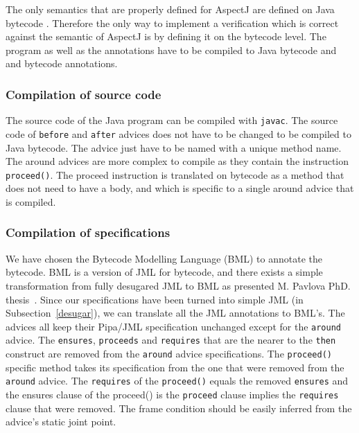 The only semantics that are properly defined for AspectJ are defined
on Java bytecode \cite{weaving06,weaving04}. Therefore the only way to
implement a verification which is correct against the semantic of
AspectJ is by defining it on the bytecode level.  The program as well
as the annotations have to be compiled to Java bytecode and
and bytecode annotations. 

\subsubsection{Compilation of source code}
The source code of the Java program can be compiled with {\tt javac}.
The source code of {\tt before} and {\tt after}
advices does not have to be changed to be compiled to Java bytecode.
The advice just have to be named with a unique method name.
The around advices are more complex to compile as they contain the instruction
{\tt proceed()}. The proceed instruction is translated on bytecode as
a method that does not need to have a body, and which is specific 
to a single around advice that is compiled.


\subsubsection{Compilation of specifications} 
We have chosen the Bytecode Modelling Language (BML) to annotate the
bytecode. BML is a version of JML for bytecode, and there exists a
simple transformation from fully desugared JML to BML as presented
M. Pavlova PhD. thesis~\cite{PavlovaPhd}. Since our specifications
have been turned into simple JML (in Subsection~\ref{desugar}), we can
translate all the JML annotations to BML's. The advices all keep their
Pipa/JML specification unchanged except for the {\tt around} advice.
The {\tt ensures}, {\tt proceeds} and {\tt requires} that are the
nearer to the {\tt then} construct are removed from the {\tt around}
advice specifications. The {\tt proceed()} specific method takes its
specification from the one that were removed from the {\tt around} advice.
The {\tt requires} of the {\tt proceed()} equals the removed {\tt ensures}
and the ensures clause of the proceed() is the {\tt proceed} clause 
implies the {\tt requires} clause that were removed.
The frame condition should be easily inferred from the advice's 
static joint point.

